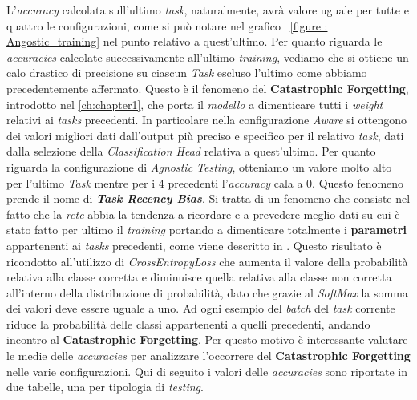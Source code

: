 L'\textit{accuracy} calcolata sull'ultimo \textit{task}, naturalmente, avrà valore uguale per tutte e quattro le configurazioni, come si può notare nel grafico ~\ref{figure : Angostic_training} nel punto relativo a quest'ultimo.
\newline
Per quanto riguarda le \textit{accuracies} calcolate successivamente all'ultimo \textit{training}, vediamo che si ottiene un calo drastico di precisione su ciascun \textit{Task} escluso l'ultimo come abbiamo precedentemente affermato. Questo è il fenomeno del \textbf{Catastrophic Forgetting}, introdotto nel \autoref{ch:chapter1}, che porta il \textit{modello} a dimenticare tutti i \textit{weight} relativi ai \textit{tasks} precedenti.
In particolare nella configurazione \textit{Aware} si ottengono dei valori migliori dati dall'output più preciso e specifico per il relativo \textit{task}, dati dalla selezione della \textit{Classification Head} relativa a quest'ultimo. Per quanto riguarda la configurazione di \textit{Agnostic Testing}, otteniamo un valore molto alto per l'ultimo \textit{Task} mentre per i 4 precedenti l'\textit{accuracy} cala a 0. Questo fenomeno prende il nome di 
\textit{\textbf{Task Recency Bias}}. Si tratta di un fenomeno che consiste nel fatto che la \textit{rete} abbia la tendenza a ricordare e a prevedere meglio dati su cui è stato fatto per ultimo il \textit{training} portando a dimenticare totalmente i \textbf{parametri} appartenenti ai \textit{tasks} precedenti, come viene descritto in \cite{Task_Recency_Bias}. Questo risultato è ricondotto all'utilizzo di \textit{CrossEntropyLoss}  che aumenta il valore della probabilità relativa alla classe corretta e diminuisce quella relativa alla classe non corretta all'interno della distribuzione di probabilità, dato che grazie al \textit{SoftMax} la somma dei valori deve essere uguale a uno. Ad ogni esempio del \textit{batch} del \textit{task} corrente riduce la probabilità delle classi appartenenti a quelli precedenti, andando incontro al \textbf{Catastrophic Forgetting}.
\newline
Per questo motivo è interessante valutare le medie delle \textit{accuracies} per analizzare l'occorrere del \textbf{Catastrophic Forgetting} nelle varie configurazioni.
Qui di seguito i valori delle \textit{accuracies} sono  riportate in due tabelle, una per tipologia di \textit{testing}.
